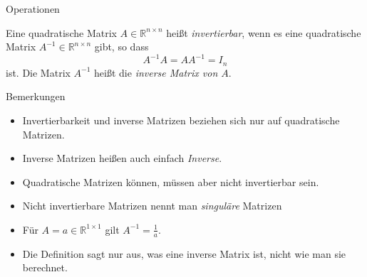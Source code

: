 \documentclass[
  8pt,
  ignorenonframetext,
]{beamer}
\providecommand{\tightlist}{%
  \setlength{\itemsep}{0pt}\setlength{\parskip}{0pt}}
\begin{document}
\begin{frame}{Operationen}
\protect\hypertarget{operationen-24}{}
\small
\begin{definition}
\justifying
Eine quadratische Matrix $A \in \mathbb{R}^{n \times n}$ heißt \textit{invertierbar}, wenn es eine
quadratische Matrix $A^{-1} \in \mathbb{R}^{n \times n}$ gibt, so dass
\begin{equation}
A^{-1}A = AA^{-1} = I_n
\end{equation}
ist. Die Matrix $A^{-1}$ heißt die \textit{inverse Matrix von $A$}.
\end{definition}

\footnotesize

Bemerkungen

\begin{itemize}
\tightlist
\item
  Invertierbarkeit und inverse Matrizen beziehen sich nur auf
  quadratische Matrizen.
\item
  Inverse Matrizen heißen auch einfach \emph{Inverse}.
\item
  Quadratische Matrizen können, müssen aber nicht invertierbar sein.
\item
  Nicht invertierbare Matrizen nennt man \emph{singuläre} Matrizen
\item
  Für \(A = a \in \mathbb{R}^{1 \times 1}\) gilt
  \(A^{-1} = \frac{1}{a}\).
\item
  Die Definition sagt nur aus, was eine inverse Matrix ist, nicht wie
  man sie berechnet.
\end{itemize}
\end{frame}
\end{document}

